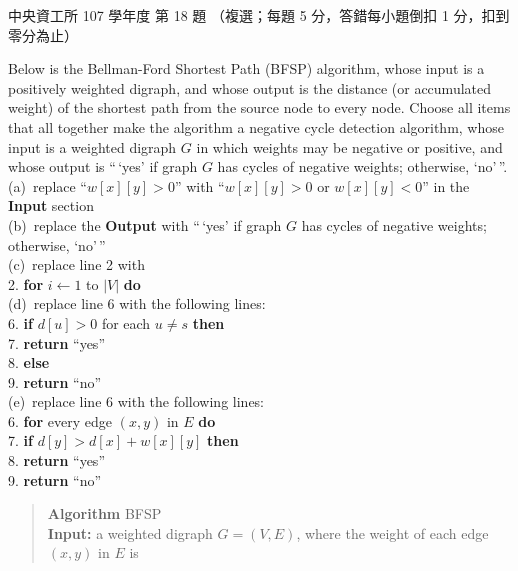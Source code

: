 \begin{pastexam}[label={px:ncu-107-dsa-18}]{中央資工所 107 學年度 第 18 題}
（複選；每題 5 分，答錯每小題倒扣 1 分，扣到零分為止）

Below is the Bellman-Ford Shortest Path (BFSP) algorithm, whose input is a positively weighted
digraph, and whose output is the distance (or accumulated weight) of the shortest path from the
source node to every node. Choose all items that all together make the algorithm a negative cycle
detection algorithm, whose input is a weighted digraph $G$ in which weights may be negative or
positive, and whose output is ``\,`yes' if graph $G$ has cycles of negative weights; otherwise,
`no'\,''.\\
(a)~replace ``$w[x][y]>0$'' with ``$w[x][y]>0$ or $w[x][y]<0$'' in the \textbf{Input} section\\
(b)~replace the \textbf{Output} with ``\,`yes' if graph $G$ has cycles of negative weights;
otherwise, `no'\,''\\
(c)~replace line 2 with\\
\hspace*{2em}2. \textbf{for} $i\leftarrow 1$ to $|V|$ \textbf{do}\\
(d)~replace line 6 with the following lines:\\
\hspace*{2em}6. \textbf{if} $d[u]>0$ for each $u\ne s$ \textbf{then}\\
\hspace*{2em}7. \qquad \textbf{return} ``yes''\\
\hspace*{2em}8. \textbf{else}\\
\hspace*{2em}9. \qquad \textbf{return} ``no''\\
(e)~replace line 6 with the following lines:\\
\hspace*{2em}6. \textbf{for} every edge $(x,y)$ in $E$ \textbf{do}\\
\hspace*{2em}7. \quad \textbf{if} $d[y]>d[x]+w[x][y]$ \textbf{then}\\
\hspace*{2em}8. \qquad\quad \textbf{return} ``yes''\\
\hspace*{2em}9. \textbf{return} ``no''
\begin{quote}
\textbf{Algorithm} BFSP\\
\textbf{Input:} a weighted digraph $G=(V,E)$, where the weight of each edge $(x,y)$ in $E$ is

\end{quote}
\end{pastexam}
